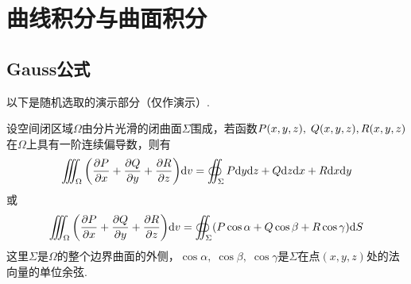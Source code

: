 \documentclass[12pt, a4paper, oneside, UTF8]{ctexbook}  %
\begin{document}
\else
\fi

\chapter{曲线积分与曲面积分}
\section{Gauss公式}

\begin{rmk}
    以下是随机选取的演示部分（仅作演示）.
\end{rmk}

\begin{thm}
    设空间闭区域$\Omega$由分片光滑的闭曲面$\Sigma$围成，若函数$P(x,y,z),\;Q(x,y,z) \\ ,R(x,y,z)$在$\Omega$上具有一阶连续偏导数，则有
    \begin{equation}
        \iiint_{\Omega} \bigg(\frac{\partial P}{\partial x}+\frac{\partial Q}{\partial y}+\frac{\partial R}{\partial z} \bigg)\textup{d} v = \oiint_{\Sigma}P\textup{d} y\textup{d} z+Q\textup{d} z\textup{d} x+R\textup{d} x\textup{d} y
    \end{equation}
    或
    \begin{equation}
        \iiint_{\Omega} \bigg(\frac{\partial P}{\partial x}+\frac{\partial Q}{\partial y}+\frac{\partial R}{\partial z} \bigg)\textup{d} v = \oiint_{\Sigma}(P\cos\alpha+Q\cos\beta+R\cos\gamma)\textup{d} S
    \end{equation}
    这里$\Sigma$是$\Omega$的整个边界曲面的外侧，$\cos\alpha,\;\cos\beta,\;\cos\gamma$是$\Sigma$在点$(x,y,z)$处的法向量的单位余弦.
\end{thm}
\end{document}
